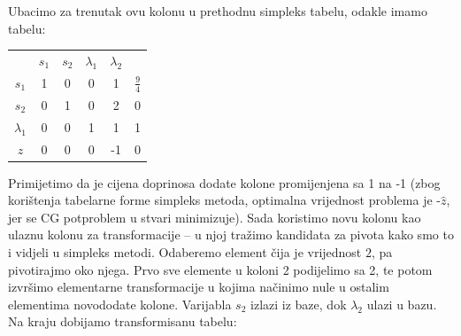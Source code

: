 \documentclass[a4paper, utf8, 11pt, colorlinks]{book}
\begin{document}
Ubacimo za trenutak ovu kolonu u prethodnu simpleks tabelu, odakle imamo tabelu: 

 \begin{center}
 	
 	\begin{tabular}{c|ccccc}
 	                &$s_1$        & $ s_2$   &  $\lambda_1$ & $\lambda_2$   &                \\
 		$s_1$	    &   1      &    0         &   0         &     1         &  $\frac{9}{4}$ \\
 		$s_2$	    &   0      &    1         &   0         &     2         &  0             \\
 		$\lambda_1$ &   0      &    0         &   1         &     1         &  1             \\ \hline
 		$z$         &   0      &    0         &   0         &    -1         &  0
 	\end{tabular}
 \end{center}
Primijetimo da je cijena doprinosa dodate kolone promijenjena sa 1 na -1 (zbog korištenja tabelarne forme simpleks metoda, optimalna vrijednost problema je -$\hat{z}$, jer se CG potproblem u stvari minimizuje). Sada koristimo novu kolonu kao ulaznu kolonu za transformacije -- u njoj tražimo kandidata za pivota kako smo to i vidjeli u simpleks metodi. Odaberemo element čija je vrijednost $2$, pa pivotirajmo oko njega. Prvo sve elemente u koloni 2 podijelimo sa 2, te potom izvršimo elementarne transformacije u kojima načinimo nule u ostalim elementima novododate kolone. Varijabla $s_2$ izlazi iz baze, dok $\lambda_2$ ulazi u bazu. Na kraju dobijamo transformisanu tabelu:
\end{document}
